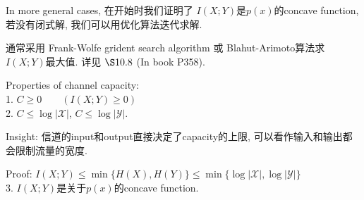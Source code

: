In more general cases, 在开始时我们证明了 $I(X;Y)$是$p(x)$的concave function, 若没有闭式解, 我们可以用优化算法迭代求解.

通常采用 Frank-Wolfe grident search algorithm 或 Blahut-Arimoto算法求 $I(X;Y)$最大值. 详见 $\S 10.8$ (In book P358).

\begin{proposition}
Properties of channel capacity: \\
1. $C\geq 0 \qquad(I(X;Y)\geq 0)$ \\
2. $C\leq \log \left|\mathcal{X}\right|$, $C\leq \log \left|\mathcal{Y}\right|$.

Insight: 信道的input和output直接决定了capacity的上限, 可以看作输入和输出都会限制流量的宽度.

Proof: $I(X;Y)\leq \min\{H(X),H(Y)\} \leq \min\{\log\left|\mathcal{X}\right|,\log \left|\mathcal{Y}\right|\}$ \\
3. $I(X;Y)$是关于$p(x)$的concave function.
\end{proposition}